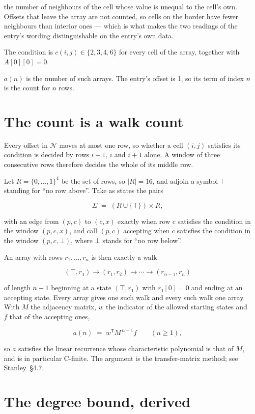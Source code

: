 \documentclass[11pt]{article}
\theoremstyle{definition}
\begin{document}
the number of neighbours of the cell whose value is unequal to the cell's own. Offsets that leave the array are not counted, so cells on the border have fewer neighbours than interior ones --- which is what makes the two readings of the entry's wording distinguishable on the entry's own data.

The condition is $c(i,j) \in \{2, 3, 4, 6\}$ for every cell of the array, together with $A[0][0]=0$.

$a(n)$ is the number of such arrays. The entry's offset is 1, so its term of index $n$ is the count for $n$ rows.

\section{The count is a walk count}

Every offset in $\mathcal{N}$ moves at most one row, so whether a cell $(i,j)$ satisfies its condition is decided by rows $i-1$, $i$ and $i+1$ alone. A window of three consecutive rows therefore decides the whole of its middle row.

Let $R = \{0,\dots,1\}^{4}$ be the set of rows, so $|R| = 16$, and adjoin a symbol $\top$ standing for ``no row above''. Take as states the pairs

\[\Sigma \;=\; (R \cup \{\top\}) \times R,\]

with an edge from $(p,c)$ to $(c,x)$ exactly when row $c$ satisfies the condition in the window $(p,c,x)$, and call $(p,c)$ accepting when $c$ satisfies the condition in the window $(p,c,\bot)$, where $\bot$ stands for ``no row below''.

An array with rows $r_1,\dots,r_n$ is then exactly a walk

\[(\top,r_1) \to (r_1,r_2) \to \cdots \to (r_{n-1},r_n)\]

of length $n-1$ beginning at a state $(\top,r_1)$ with $r_1[0]=0$ and ending at an accepting state. Every array gives one such walk and every such walk one array. With $M$ the adjacency matrix, $w$ the indicator of the allowed starting states and $f$ that of the accepting ones,

\[a(n) \;=\; w^{\mathsf T} M^{\,n-1} f \qquad (n \ge 1),\]

so $a$ satisfies the linear recurrence whose characteristic polynomial is that of $M$, and is in particular C-finite. The argument is the transfer-matrix method; see Stanley~\S4.7.

\section{The degree bound, derived}
\end{document}
